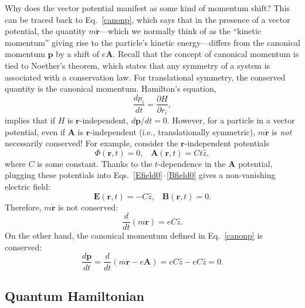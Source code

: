 \documentclass[prx,12pt]{revtex4-2}
\begin{document}
Why does the vector potential manifest as some kind of momentum shift?
This can be traced back to Eq.~\eqref{canonp}, which says that in the
presence of a vector potential, the quantity
$m\dot{\mathbf{r}}$---which we normally think of as the ``kinetic
momentum'' giving rise to the particle's kinetic energy---differs from
the canonical momentum $\mathbf{p}$ by a shift of $e\mathbf{A}$.
Recall that the concept of canonical momentum is tied to Noether's
theorem, which states that any symmetry of a system is associated with
a conservation law.  For translational symmetry, the conserved
quantity is the canonical momentum.  Hamilton's equation,
\begin{equation*}
  \frac{dp_i}{dt} = \frac{\partial H}{\partial r_i},
\end{equation*}
implies that if $H$ is $\mathbf{r}$-independent, $d\mathbf{p}/dt = 0$.
However, for a particle in a vector potential, even if $\mathbf{A}$ is
$\mathbf{r}$-independent (i.e., translationally symmetric),
$m\dot{\mathbf{r}}$ is \textit{not} necessarily conserved!  For
example, consider the $\mathbf{r}$-independent potentials
\begin{equation}
  \Phi(\mathbf{r}, t) = 0, \;\;\; \mathbf{A}(\mathbf{r}, t) = Ct \hat{z},
\end{equation}
where $C$ is some constant.  Thanks to the $t$-dependence in the
$\mathbf{A}$ potential, plugging these potentials into
Eqs.~\eqref{Efield0}--\eqref{Bfield0} gives a non-vanishing electric
field:
\begin{equation}
  \mathbf{E}(\mathbf{r},t) = - C\hat{z}, \;\;\;\mathbf{B}(\mathbf{r},t) = 0.
\end{equation}
Therefore, $m\dot{\mathbf{r}}$ is not conserved:
\begin{equation}
  \frac{d}{dt}(m\dot{\mathbf{r}}) = eC\hat{z}.
\end{equation}
On the other hand, the canonical momentum defined in
Eq.~\eqref{canonp} is conserved:
\begin{equation}
  \frac{d\mathbf{p}}{dt} =
  \frac{d}{dt}(m\dot{\mathbf{r}} - e\mathbf{A}) =
  eC\hat{z} - eC\hat{z} = 0.
\end{equation}

\subsection{Quantum Hamiltonian}
\end{document}
